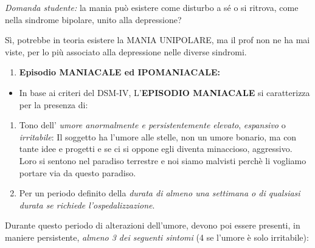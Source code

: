 \documentclass[]{article}
\begin{document}
\emph{Domanda studente:} la mania può esistere come disturbo a sé o si
ritrova, come nella sindrome bipolare, unito alla depressione?

Sì, potrebbe in teoria esistere la MANIA UNIPOLARE, ma il prof non ne ha
mai viste, per lo più associato alla depressione nelle diverse sindromi.

\begin{enumerate}
\def\labelenumi{\arabic{enumi}.}
\item
  \textbf{Episodio MANIACALE ed IPOMANIACALE:}
\end{enumerate}

\begin{itemize}
\item
  In base ai criteri del DSM-IV, L'\textbf{EPISODIO MANIACALE} si
  caratterizza per la presenza di:
\end{itemize}

\begin{enumerate}
\def\labelenumi{\arabic{enumi}.}
\item
  Tono dell' \emph{umore anormalmente e persistentemente elevato},
  \emph{espansivo} o \emph{irritabile}: Il soggetto ha l'umore alle
  stelle, non un umore bonario, ma con tante idee e progetti e se ci si
  oppone egli diventa minaccioso, aggressivo. Loro si sentono nel
  paradiso terrestre e noi siamo malvisti perchè li vogliamo portare via
  da questo paradiso.
\item
  Per un periodo definito della \emph{durata di almeno una settimana o
  di qualsiasi durata se richiede l'ospedalizzazione}.
\end{enumerate}

Durante questo periodo di alterazioni dell'umore, devono poi essere
presenti, in maniere persistente, \emph{almeno 3 dei seguenti sintomi}
(4 se l'umore è solo irritabile):
\end{document}
